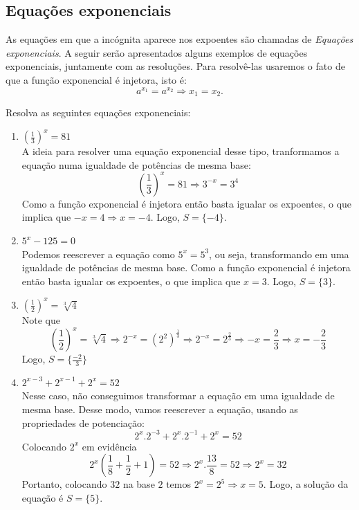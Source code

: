 \subsection{Equações exponenciais}
As equações em que a incógnita aparece nos expoentes são chamadas de \textit{Equações exponenciais}. A seguir serão apresentados alguns exemplos de equações exponenciais, juntamente com as resoluções. Para resolvê-las usaremos o fato de que a função exponencial é injetora, isto é:
\begin{equation*}
    a^{x_1}=a^{x_2} \Longrightarrow x_1=x_2.
\end{equation*}
\begin{exe}
Resolva as seguintes equações  exponenciais:
\begin{enumerate}
  \item $\left( \frac{1}{3}\right)^x=81$ \\
  \color{red} A ideia para resolver uma equação exponencial desse tipo, tranformamos a equação numa igualdade de potências de mesma base:
  $$\left( \frac{1}{3}\right)^x=81 \Longrightarrow 3^{-x}=3^4$$
  Como a função exponencial é injetora então basta igualar os expoentes, o que implica que $-x=4 \Longrightarrow x=-4$. Logo, $S=\{ -4 \}$.
  \color{black}
    \item $5^x-125=0$ \\
    \color{red} Podemos reescrever a equação como $5^x=5^3$, ou seja, transformando em uma igualdade de potências de mesma base. Como a função exponencial é injetora então basta igualar os expoentes, o que implica que $x=3$. Logo, $S=\{ 3 \}$.
    \color{black}
    \item $ \left( \frac{1}{2} \right)^x=\sqrt[3]{4}$ \\
    \color{red}
    Note que
    $$ \left( \frac{1}{2} \right)^x=\sqrt[3]{4} \Longrightarrow 2^{-x}= (2^2)^{\frac{1}{3}} \Longrightarrow 2^{-x}=2^{\frac{2}{3}} \Longrightarrow -x= \frac{2}{3} \Longrightarrow x=-\frac{2}{3}$$
    Logo, $S=\{ \frac{-2}{3} \}$
    \color{black}
    \item $2^{x-3}+2^{x-1}+2^x=52$ \\
    \color{red}
    Nesse caso, não conseguimos transformar a equação em uma igualdade de mesma base. Desse modo, vamos reescrever a equação, usando as propriedades de potenciação:
    $$2^x. 2^{-3}+2^x .2^{-1}+ 2^x=52$$
    Colocando $2^x$ em evidência
    $$2^x \left( \frac{1}{8}+ \frac{1}{2}+1\right)=52 \Longrightarrow 2^x. \frac{13}{8}=52 \Longrightarrow 2^x= 32 $$
    Portanto, colocando $32$ na base $2$ temos $2^x=2^5 \Longrightarrow x=5$. Logo, a solução da equação é $S=\{5 \}$.
    \color{black}


\end{enumerate}
\end{exe}
